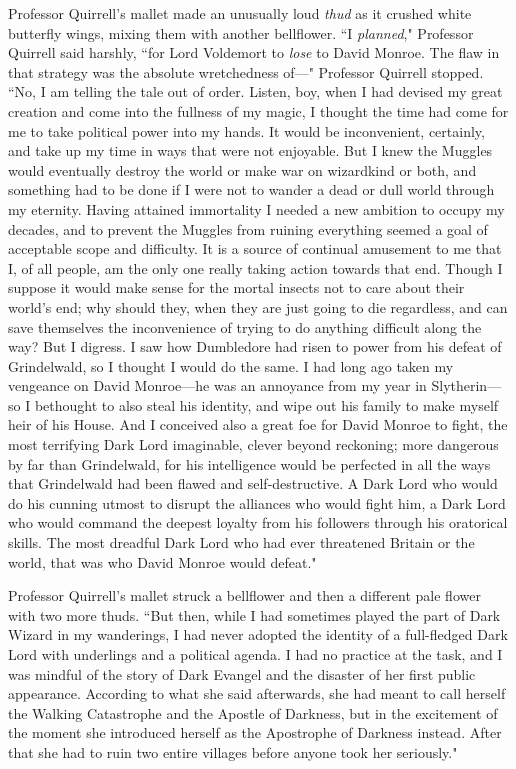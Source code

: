 Professor Quirrell's mallet made an unusually loud \emph{thud} as it crushed white butterfly wings, mixing them with another bellflower. ``I \emph{planned}," Professor Quirrell said harshly, ``for Lord Voldemort to \emph{lose} to David Monroe. The flaw in that strategy was the absolute wretchedness of—" Professor Quirrell stopped. ``No, I am telling the tale out of order. Listen, boy, when I had devised my great creation and come into the fullness of my magic, I thought the time had come for me to take political power into my hands. It would be inconvenient, certainly, and take up my time in ways that were not enjoyable. But I knew the Muggles would eventually destroy the world or make war on wizardkind or both, and something had to be done if I were not to wander a dead or dull world through my eternity. Having attained immortality I needed a new ambition to occupy my decades, and to prevent the Muggles from ruining everything seemed a goal of acceptable scope and difficulty. It is a source of continual amusement to me that I, of all people, am the only one really taking action towards that end. Though I suppose it would make sense for the mortal insects not to care about their world's end; why should they, when they are just going to die regardless, and can save themselves the inconvenience of trying to do anything difficult along the way? But I digress. I saw how Dumbledore had risen to power from his defeat of Grindelwald, so I thought I would do the same. I had long ago taken my vengeance on David Monroe—he was an annoyance from my year in Slytherin—so I bethought to also steal his identity, and wipe out his family to make myself heir of his House. And I conceived also a great foe for David Monroe to fight, the most terrifying Dark Lord imaginable, clever beyond reckoning; more dangerous by far than Grindelwald, for his intelligence would be perfected in all the ways that Grindelwald had been flawed and self-destructive. A Dark Lord who would do his cunning utmost to disrupt the alliances who would fight him, a Dark Lord who would command the deepest loyalty from his followers through his oratorical skills. The most dreadful Dark Lord who had ever threatened Britain or the world, that was who David Monroe would defeat."

Professor Quirrell's mallet struck a bellflower and then a different pale flower with two more thuds. ``But then, while I had sometimes played the part of Dark Wizard in my wanderings, I had never adopted the identity of a full-fledged Dark Lord with underlings and a political agenda. I had no practice at the task, and I was mindful of the story of Dark Evangel and the disaster of her first public appearance. According to what she said afterwards, she had meant to call herself the Walking Catastrophe and the Apostle of Darkness, but in the excitement of the moment she introduced herself as the Apostrophe of Darkness instead. After that she had to ruin two entire villages before anyone took her seriously."

